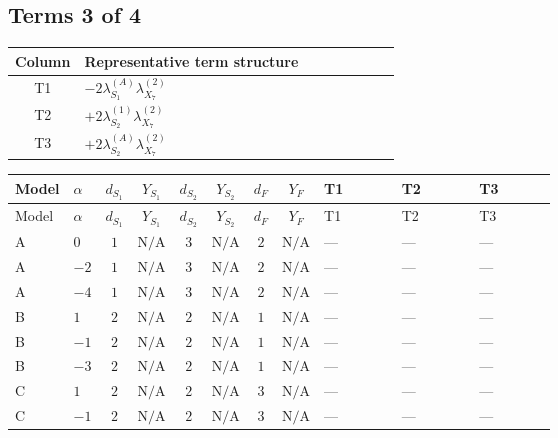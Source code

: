 \documentclass[8pt]{article}
\begin{document}
\begin{landscape}
\subsection*{Terms 3 of 4}
\begin{center}
\begin{tabular}{@{}c >{\raggedright\arraybackslash}p{0.82\linewidth}@{}}
\toprule
Column & Representative term structure \\
\midrule
T1 & \(\displaystyle -2 {\lambda_{S_1}^{(A)}} {\lambda_{X_{7}}^{(2)}}\) \\
\midrule
T2 & \(\displaystyle +2 {\lambda_{S_2}^{(1)}} {\lambda_{X_{7}}^{(2)}}\) \\
\midrule
T3 & \(\displaystyle +2 {\lambda_{S_2}^{(A)}} {\lambda_{X_{7}}^{(2)}}\) \\
\midrule
\bottomrule
\end{tabular}
\end{center}
\smallskip
\tiny
\begin{longtable}{@{}llcccccc >{\raggedright\arraybackslash}p{0.21\linewidth} >{\raggedright\arraybackslash}p{0.21\linewidth} >{\raggedright\arraybackslash}p{0.21\linewidth}@{}}
\toprule
Model & $\alpha$ & $d_{S_1}$ & $Y_{S_1}$ & $d_{S_2}$ & $Y_{S_2}$ & $d_F$ & $Y_F$ & T1 & T2 & T3 \\
\midrule
\endfirsthead
\toprule
Model & $\alpha$ & $d_{S_1}$ & $Y_{S_1}$ & $d_{S_2}$ & $Y_{S_2}$ & $d_F$ & $Y_F$ & T1 & T2 & T3 \\
\midrule
\endhead
A & $0$ & $1$ & $\text{N/A}$ & $3$ & $\text{N/A}$ & $2$ & $\text{N/A}$ & --- & --- & --- \\
\midrule
A & $-2$ & $1$ & $\text{N/A}$ & $3$ & $\text{N/A}$ & $2$ & $\text{N/A}$ & --- & --- & --- \\
\midrule
A & $-4$ & $1$ & $\text{N/A}$ & $3$ & $\text{N/A}$ & $2$ & $\text{N/A}$ & --- & --- & --- \\
\midrule
B & $1$ & $2$ & $\text{N/A}$ & $2$ & $\text{N/A}$ & $1$ & $\text{N/A}$ & --- & --- & --- \\
\midrule
B & $-1$ & $2$ & $\text{N/A}$ & $2$ & $\text{N/A}$ & $1$ & $\text{N/A}$ & --- & --- & --- \\
\midrule
B & $-3$ & $2$ & $\text{N/A}$ & $2$ & $\text{N/A}$ & $1$ & $\text{N/A}$ & --- & --- & --- \\
\midrule
C & $1$ & $2$ & $\text{N/A}$ & $2$ & $\text{N/A}$ & $3$ & $\text{N/A}$ & --- & --- & --- \\
\midrule
C & $-1$ & $2$ & $\text{N/A}$ & $2$ & $\text{N/A}$ & $3$ & $\text{N/A}$ & --- & --- & --- \\

\end{longtable}
\end{landscape}
\end{document}
